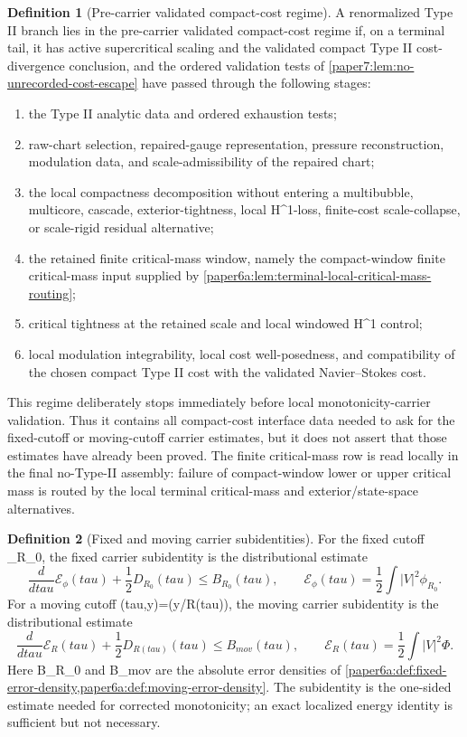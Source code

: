 \documentclass[11pt]{amsart}
\def\({}%
\def\){}%
\def\tilde#1{#1}%
\def\mathfrak#1{#1}%
\def\mathrm#1{#1}%
\def\tau{tau}%
\theoremstyle{plain}
\theoremstyle{definition}
\newtheorem{definition}[definition]{Definition}
\theoremstyle{remark}
\begin{document}
\begin{definition}[Pre-carrier validated compact-cost regime]
\label{paper7:def:precarrier-validated-compact-channel}
A renormalized Type II branch lies in the pre-carrier validated compact-cost
regime if, on a terminal tail, it has active supercritical scaling and the
validated compact Type II cost-divergence conclusion, and the ordered validation
tests of \cref{paper7:lem:no-unrecorded-cost-escape} have passed through the
following stages:
\begin{enumerate}[label=\textup{(\roman*)}]
\item the Type II analytic data and ordered exhaustion tests;
\item raw-chart selection, repaired-gauge representation, pressure
reconstruction, modulation data, and scale-admissibility of the repaired chart;
\item the local compactness decomposition without entering a multibubble,
multicore, cascade, exterior-tightness, local \(H^1\)-loss,
finite-cost scale-collapse, or scale-rigid residual alternative;
\item the retained finite critical-mass window, namely the compact-window
finite critical-mass input supplied by
\cref{paper6a:lem:terminal-local-critical-mass-routing};
\item critical tightness at the retained scale and local windowed \(H^1\)
control;
\item local modulation integrability, local cost well-posedness, and
compatibility of the chosen compact Type II cost with the validated
Navier--Stokes cost.
\end{enumerate}
This regime deliberately stops immediately before local monotonicity-carrier
validation.  Thus it contains all compact-cost interface data needed to ask for
the fixed-cutoff or moving-cutoff carrier estimates, but it does not assert
that those estimates have already been proved.
The finite critical-mass row is read locally in the final no-Type-II assembly:
failure of compact-window lower or upper critical mass is routed by the local
terminal critical-mass and exterior/state-space alternatives.
\end{definition}

\begin{definition}[Fixed and moving carrier subidentities]
\label{paper7:def:carrier-subidentities}
For the fixed cutoff \(\phi_{R_0}\), the fixed carrier subidentity is the
distributional estimate
\[
  \frac{d}{d\tau}\mathcal E_\phi(\tau)
  +\frac12\tilde{\mathfrak D}_{R_0}(\tau)
  \le B_{R_0}(\tau),
  \qquad
  \mathcal E_\phi(\tau)=\frac12\int |V|^2\phi_{R_0}.
\]
For a moving cutoff \(\Phi(\tau,y)=\phi(y/R(\tau))\), the moving carrier
subidentity is the distributional estimate
\[
  \frac{d}{d\tau}\mathcal E_R(\tau)
  +\frac12\tilde{\mathfrak D}_{R(\tau)}(\tau)
  \le B_{\mathrm{mov}}(\tau),
  \qquad
  \mathcal E_R(\tau)=\frac12\int |V|^2\Phi .
\]
Here \(B_{R_0}\) and \(B_{\mathrm{mov}}\) are the absolute error densities of
\cref{paper6a:def:fixed-error-density,paper6a:def:moving-error-density}.  The
subidentity is the one-sided estimate needed for corrected monotonicity; an
exact localized energy identity is sufficient but not necessary.
\end{definition}
\end{document}
